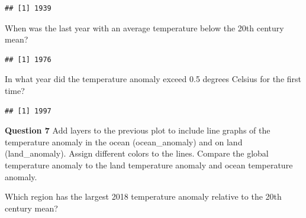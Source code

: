\documentclass[
]{article}
\newenvironment{Shaded}{\begin{snugshade}}{\end{snugshade}}
\newcommand{\DecValTok}[1]{\textcolor[rgb]{0.00,0.00,0.81}{#1}}
\newcommand{\FloatTok}[1]{\textcolor[rgb]{0.00,0.00,0.81}{#1}}
\newcommand{\KeywordTok}[1]{\textcolor[rgb]{0.13,0.29,0.53}{\textbf{#1}}}
\newcommand{\NormalTok}[1]{#1}
\newcommand{\OperatorTok}[1]{\textcolor[rgb]{0.81,0.36,0.00}{\textbf{#1}}}
\newcommand{\StringTok}[1]{\textcolor[rgb]{0.31,0.60,0.02}{#1}}
\begin{document}
\begin{verbatim}
## [1] 1939
\end{verbatim}

When was the last year with an average temperature below the 20th
century mean?

\begin{Shaded}
\end{Shaded}

\begin{verbatim}
## [1] 1976
\end{verbatim}

In what year did the temperature anomaly exceed 0.5 degrees Celsius for
the first time?

\begin{Shaded}
\end{Shaded}

\begin{verbatim}
## [1] 1997
\end{verbatim}

\textbf{Question 7} Add layers to the previous plot to include line
graphs of the temperature anomaly in the ocean (ocean\_anomaly) and on
land (land\_anomaly). Assign different colors to the lines. Compare the
global temperature anomaly to the land temperature anomaly and ocean
temperature anomaly.

Which region has the largest 2018 temperature anomaly relative to the
20th century mean?
\end{document}
